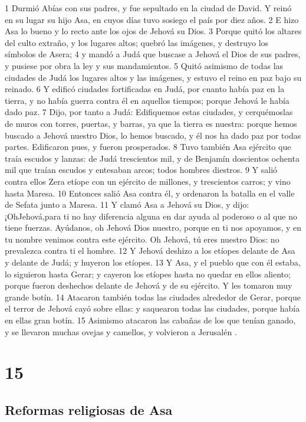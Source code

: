 1 Durmió Abías con sus padres, y fue sepultado en la ciudad de David. Y reinó en su lugar su hijo Asa, en cuyos días tuvo sosiego el país por diez años.
2 E hizo Asa lo bueno y lo recto ante los ojos de Jehová su Dios.
3 Porque quitó los altares del culto extraño, y los lugares altos; quebró las imágenes, y destruyo los símbolos de Asera;
4 y mandó a Judá que buscase a Jehová el Dios de sus padres, y pusiese por obra la ley y sus mandamientos.
5 Quitó asimismo de todas las ciudades de Judá los lugares altos y las imágenes, y estuvo el reino en paz bajo su reinado. 
6 Y edificó ciudades fortificadas en Judá, por cuanto había paz en la tierra, y no había guerra contra él en aquellos tiempos; porque Jehová le había dado paz.
7 Dijo, por tanto a Judá: Edifiquemos estas ciudades, y cerquémoslas de muros con torres, puertas, y barras, ya que la tierra es nuestra: porque hemos buscado a Jehová nuestro Dios, lo hemos buscado, y él nos ha dado paz por todas partes. Edificaron pues, y fueron prosperados.
8 Tuvo también Asa ejército que traía escudos y lanzas: de Judá trescientos mil, y de Benjamín doscientos ochenta mil que traían escudos y entesaban arcos; todos hombres diestros.
9 Y salió contra ellos Zera etíope con un ejército de millones, y trescientos carros; y vino hasta Maresa.
10 Entonces salió Asa contra él, y ordenaron la batalla en el valle de Sefata junto a Maresa.
11 Y clamó Asa a Jehová su Dios, y dijo: ¡OhJehová,para ti no hay diferencia alguna en dar ayuda al poderoso o al que no tiene fuerzas. Ayúdanos, oh Jehová Dios nuestro, porque en ti nos apoyamos, y en tu nombre venimos contra este ejército. Oh Jehová, tú eres nuestro Dios: no prevalezca contra ti el hombre.
12 Y Jehová deshizo a los etíopes delante de Asa y delante de Judá; y huyeron los etíopes.
13 Y Asa, y el pueblo que con él estaba, lo siguieron hasta Gerar; y cayeron los etíopes hasta no quedar en ellos aliento; porque fueron deshechos delante de Jehová y de su ejército. Y les tomaron muy grande botín.
14 Atacaron también todas las ciudades alrededor de Gerar, porque el terror de Jehová cayó sobre ellas: y saquearon todas las ciudades, porque había en ellas gran botín.
15 Asimismo atacaron las cabañas de los que tenían ganado, y se llevaron muchas ovejas y camellos, y volvieron a Jerusalén .

\chapter{15}

\section*{Reformas religiosas de Asa }

